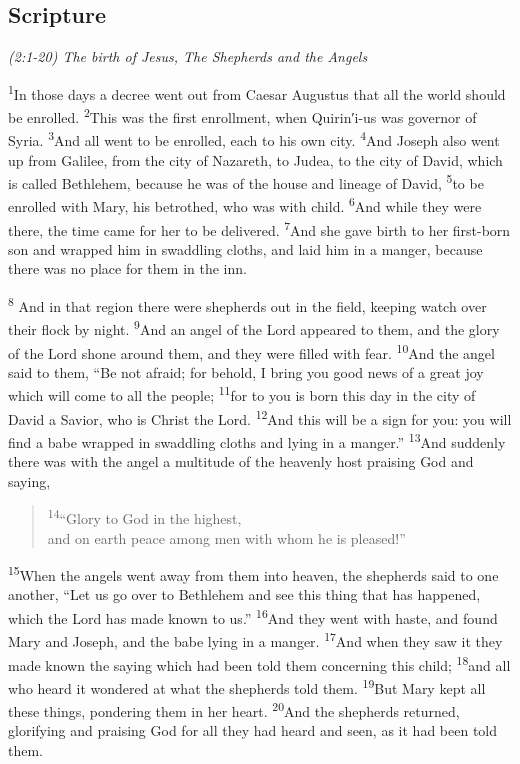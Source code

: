 \documentclass[letterpaper]{report}
\newcommand{\vs}[1]{\textsuperscript{#1}}
\begin{document}
\subsection{Scripture}
{\centering
\emph{(2:1-20) The birth of Jesus,
	The Shepherds and the Angels}\\
}
\begin{multicols}{2}
\vs{1}In those days a decree went out from Caesar Augustus that all the world
should be enrolled.
\vs{2}This was the first enrollment, when Quirin′i-us was governor of Syria.
\vs{3}And all went to be enrolled, each to his own city.
\vs{4}And Joseph also went up from Galilee, from the city of Nazareth,
to Judea, to the city of David, which is called Bethlehem,
because he was of the house and lineage of David,
\vs{5}to be enrolled with Mary, his betrothed, who was with child.
\vs{6}And while they were there, the time came for her to be delivered.
\vs{7}And she gave birth to her first-born son and wrapped him in swaddling
cloths, and laid him in a manger,
because there was no place for them in the inn.

\vs{8} And in that region there were shepherds out in the field,
keeping watch over their flock by night.
\vs{9}And an angel of the Lord appeared to them,
and the glory of the Lord shone around them,
and they were filled with fear.
\vs{10}And the angel said to them, ``Be not afraid; for behold,
I bring you good news of a great joy which will come to all the people;
\vs{11}for to you is born this day in the city of David a Savior,
who is Christ the Lord.
\vs{12}And this will be a sign for you:
you will find a babe wrapped in swaddling cloths and lying in a manger.''
\vs{13}And suddenly there was with the angel a multitude of the heavenly host 
praising God and saying,

\begin{verse}
\vs{14}``Glory to God in the highest,\\
and on earth peace among men with whom he is pleased!''\\
\end{verse}

\vs{15}When the angels went away from them into heaven,
the shepherds said to one another,
``Let us go over to Bethlehem and see this thing that has happened,
which the Lord has made known to us.''
\vs{16}And they went with haste, and found Mary and Joseph,
and the babe lying in a manger.
\vs{17}And when they saw it they made known the saying which had been told
them concerning this child;
\vs{18}and all who heard it wondered at what the shepherds told them.
\vs{19}But Mary kept all these things, pondering them in her heart.
\vs{20}And the shepherds returned,
glorifying and praising God for all they had heard and seen,
as it had been told them.


\end{multicols}
\end{document}
